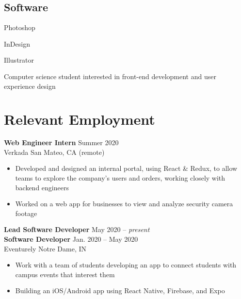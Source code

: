 \documentclass[letterpaper,10pt]{article}
\newcommand{\present}{{\itshape present}}
\newcommand{\employmentspace}{\vspace{-5pt}}
\begin{document}
\begin{minipage}[t]{\dimexpr.33\textwidth-.5\columnsep}
\begin{flushleft}
\begin{minipage}[t]{.5\textwidth}
\subsection{Software}
\begin{skillslist}
    \item Photoshop
    \item InDesign
    \item Illustrator
\end{skillslist}

\end{minipage}

\end{flushleft}
\end{minipage}
\hfill
\begin{minipage}[t]{\dimexpr.67\textwidth-.5\columnsep}

\begin{center}
    {\Huge\ttfamily\bfseries \uppercase{}}

    \medskip
    {\large\ttfamily Computer science student interested in front-end development and user experience design}
\end{center}

\section{Relevant Employment}

\textbf{Web Engineer Intern} \hfill Summer 2020 \\
Verkada \hfill San Mateo, CA (remote)

\employmentspace
\begin{itemize}
    \item Developed and designed an internal portal, using React \& Redux, to allow teams to explore the company's users and orders, working closely with backend engineers
    \item Worked on a web app for businesses to view and analyze security camera footage
\end{itemize}

\textbf{Lead Software Developer} \hfill May 2020 -- \present \\
\textbf{Software Developer} \hfill Jan. 2020 -- May 2020 \\
Eventurely \hfill Notre Dame, IN

\employmentspace
\begin{itemize}
    \item Work with a team of students developing an app to connect students with campus events that interest them
    \item Building an iOS/Android app using React Native, Firebase, and Expo
\end{itemize}


\end{minipage}
\end{document}
